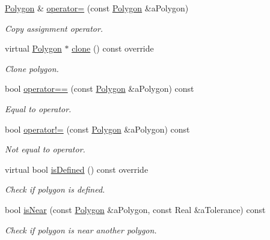\begin{DoxyCompactItemize}
\hyperlink{classostk_1_1math_1_1geom_1_1d2_1_1objects_1_1_polygon}{Polygon} \& \hyperlink{classostk_1_1math_1_1geom_1_1d2_1_1objects_1_1_polygon_aad1bdf4404a88c3da5c93e12e0cbb241}{operator=} (const \hyperlink{classostk_1_1math_1_1geom_1_1d2_1_1objects_1_1_polygon}{Polygon} \&a\+Polygon)
\begin{DoxyCompactList}\small\item\em Copy assignment operator. \end{DoxyCompactList}\item 
virtual \hyperlink{classostk_1_1math_1_1geom_1_1d2_1_1objects_1_1_polygon}{Polygon} $\ast$ \hyperlink{classostk_1_1math_1_1geom_1_1d2_1_1objects_1_1_polygon_a55e4524d1f58bf8379580e63f49f0b48}{clone} () const override
\begin{DoxyCompactList}\small\item\em Clone polygon. \end{DoxyCompactList}\item 
bool \hyperlink{classostk_1_1math_1_1geom_1_1d2_1_1objects_1_1_polygon_a6fa3a2d3811523250bbb916e5d0ff8b9}{operator==} (const \hyperlink{classostk_1_1math_1_1geom_1_1d2_1_1objects_1_1_polygon}{Polygon} \&a\+Polygon) const
\begin{DoxyCompactList}\small\item\em Equal to operator. \end{DoxyCompactList}\item 
bool \hyperlink{classostk_1_1math_1_1geom_1_1d2_1_1objects_1_1_polygon_a2a592e75608feeafd324105c65c67640}{operator!=} (const \hyperlink{classostk_1_1math_1_1geom_1_1d2_1_1objects_1_1_polygon}{Polygon} \&a\+Polygon) const
\begin{DoxyCompactList}\small\item\em Not equal to operator. \end{DoxyCompactList}\item 
virtual bool \hyperlink{classostk_1_1math_1_1geom_1_1d2_1_1objects_1_1_polygon_a81f92393dad2c6421fd4fe3834f60fa2}{is\+Defined} () const override
\begin{DoxyCompactList}\small\item\em Check if polygon is defined. \end{DoxyCompactList}\item 
bool \hyperlink{classostk_1_1math_1_1geom_1_1d2_1_1objects_1_1_polygon_a70a128f7d670604478947243e8a96937}{is\+Near} (const \hyperlink{classostk_1_1math_1_1geom_1_1d2_1_1objects_1_1_polygon}{Polygon} \&a\+Polygon, const Real \&a\+Tolerance) const
\begin{DoxyCompactList}\small\item\em Check if polygon is near another polygon. \end{DoxyCompactList}\item 

\end{DoxyCompactItemize}
